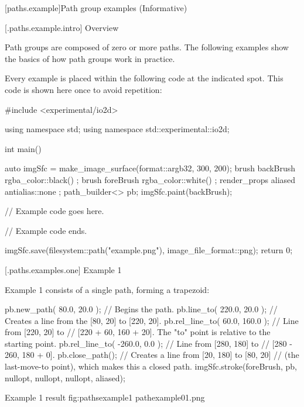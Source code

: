 

 [paths.example]{Path group examples (Informative)}

 [\iotwod.paths.example.intro] {Overview}

\pnum
Path groups are composed of zero or more paths. The following examples show the basics of how path groups work in practice.

\pnum
Every example is placed within the following code at the indicated spot. This code is shown here once to avoid repetition:

\begin{codeblock}
#include <experimental/io2d>

using namespace std;
using namespace std::experimental::io2d;

int main() {
  auto imgSfc = make_image_surface(format::argb32, 300, 200);
  brush backBrush{ rgba_color::black() };
  brush foreBrush{ rgba_color::white() };
  render_props aliased{ antialias::none };
  path_builder<> pb{};
  imgSfc.paint(backBrush);
  
  // Example code goes here.

  // Example code ends.
  
  imgSfc.save(filesystem::path("example.png"), image_file_format::png);
  return 0;
}
\end{codeblock}

 [\iotwod.paths.examples.one] {Example 1}

\pnum
Example 1 consists of a single path, forming a trapezoid:

\begin{codeblock}
  pb.new_path({ 80.0, 20.0 }); // Begins the path.
  pb.line_to({ 220.0, 20.0 }); // Creates a line from the [80, 20] to [220, 20].
  pb.rel_line_to({ 60.0, 160.0 }); // Line from [220, 20] to
    // [220 + 60, 160 + 20]. The "to" point is relative to the starting point.
  pb.rel_line_to({ -260.0, 0.0 }); // Line from [280, 180] to 
    // [280 - 260, 180 + 0].
  pb.close_path(); // Creates a line from [20, 180] to [80, 20] 
    // (the last-move-to point), which makes this a closed path.
  imgSfc.stroke(foreBrush, pb, nullopt, nullopt, nullopt, aliased);
\end{codeblock}

\begin{importgraphiciotwod}
{Example 1 result}
{fig:pathsexample1}
{pathexample01.png}
\end{importgraphiciotwod}

